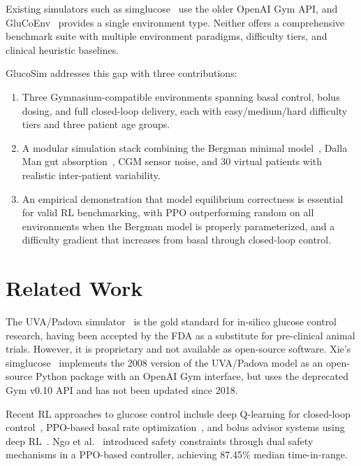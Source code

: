 \documentclass[11pt]{article}
\begin{document}
Existing simulators such as simglucose~\citep{xie2018simglucose} use the older OpenAI Gym API, and GluCoEnv~\citep{hettiarachchi2022glucoenv} provides a single environment type. Neither offers a comprehensive benchmark suite with multiple environment paradigms, difficulty tiers, and clinical heuristic baselines.

GlucoSim addresses this gap with three contributions:
\begin{enumerate}
    \item Three Gymnasium-compatible environments spanning basal control, bolus dosing, and full closed-loop delivery, each with easy/medium/hard difficulty tiers and three patient age groups.
    \item A modular simulation stack combining the Bergman minimal model~\citep{bergman1979quantitative}, Dalla Man gut absorption~\citep{dallaman2007meal}, CGM sensor noise, and 30 virtual patients with realistic inter-patient variability.
    \item An empirical demonstration that model equilibrium correctness is essential for valid RL benchmarking, with PPO outperforming random on all environments when the Bergman model is properly parameterized, and a difficulty gradient that increases from basal through closed-loop control.
\end{enumerate}

\section{Related Work}

The UVA/Padova simulator~\citep{dallaman2014uvapadova} is the gold standard for in-silico glucose control research, having been accepted by the FDA as a substitute for pre-clinical animal trials. However, it is proprietary and not available as open-source software. Xie's simglucose~\citep{xie2018simglucose} implements the 2008 version of the UVA/Padova model as an open-source Python package with an OpenAI Gym interface, but uses the deprecated Gym v0.10 API and has not been updated since 2018.

Recent RL approaches to glucose control include deep Q-learning for closed-loop control~\citep{fox2020deep}, PPO-based basal rate optimization~\citep{zhu2020basal}, and bolus advisor systems using deep RL~\citep{lee2020insulin}. Ngo et al.~\citep{ngo2025safe} introduced safety constraints through dual safety mechanisms in a PPO-based controller, achieving 87.45\% median time-in-range.
\end{document}
